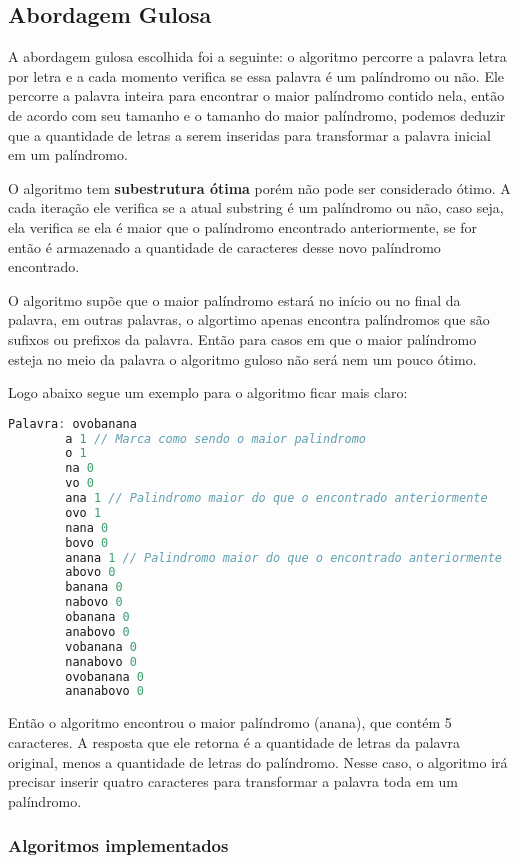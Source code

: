 \documentclass[12pt]{article}
\begin{document}
\subsection{Abordagem Gulosa}
\label{gulosa}

A abordagem gulosa escolhida foi a seguinte: o algoritmo percorre a palavra letra por letra e a cada momento verifica se essa palavra é um palíndromo ou não. Ele percorre a palavra inteira para encontrar o maior palíndromo contido nela, então de acordo com seu tamanho e o tamanho do maior palíndromo, podemos deduzir que a quantidade de letras a serem inseridas para transformar a palavra inicial em um palíndromo.

O algoritmo tem \textbf{subestrutura ótima} porém não pode ser considerado ótimo. A cada iteração ele verifica se a atual substring é um palíndromo ou não, caso seja, ela verifica se ela é maior que o palíndromo encontrado anteriormente, se for então é armazenado a quantidade de caracteres desse novo palíndromo encontrado.

O algoritmo supõe que o maior palíndromo estará no início ou no final da palavra, em outras palavras, o algortimo apenas encontra palíndromos que são sufixos ou prefixos da palavra. Então para casos em que o maior palíndromo esteja no meio da palavra o algoritmo guloso não será nem um pouco ótimo.

Logo abaixo segue um exemplo para o algoritmo ficar mais claro:

    \begin{lstlisting}[language=c]
        Palavra: ovobanana
        a 1 // Marca como sendo o maior palindromo
        o 1
        na 0
        vo 0
        ana 1 // Palindromo maior do que o encontrado anteriormente
        ovo 1
        nana 0
        bovo 0
        anana 1 // Palindromo maior do que o encontrado anteriormente
        abovo 0
        banana 0
        nabovo 0
        obanana 0
        anabovo 0
        vobanana 0
        nanabovo 0
        ovobanana 0
        ananabovo 0
    \end{lstlisting}

    Então o algoritmo encontrou o maior palíndromo (anana), que contém 5 caracteres. A resposta que ele retorna é a quantidade de letras da palavra original, menos a quantidade de letras do palíndromo. Nesse caso, o algoritmo irá precisar inserir quatro caracteres para transformar a palavra toda em um palíndromo.

\subsubsection{Algoritmos implementados}
\end{document}
